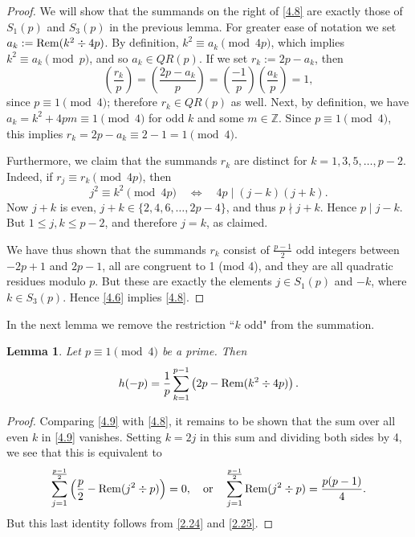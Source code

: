 \documentclass{amsart}
\theoremstyle{plain}
\newtheorem{lemma}[theorem]{Lemma}
\numberwithin{equation}{section}
\begin{document}
\begin{proof}
We will show that the summands on the right of \eqref{4.8} are exactly those of
$S_1(p)$ and $S_3(p)$ in the previous lemma. For greater ease of notation we
set $a_k:={\rm Rem}(k^2\div 4p)$. By definition, $k^2\equiv a_k\pmod{4p}$, which
implies $k^2\equiv a_k\pmod{p}$, and so $a_k\in QR(p)$. If we set $r_k:=2p-a_k$,
then 
\[
\left(\frac{r_k}{p}\right)=\left(\frac{2p-a_k}{p}\right)
=\left(\frac{-1}{p}\right)\left(\frac{a_k}{p}\right) = 1,
\]
since $p\equiv 1\pmod{4}$; therefore $r_k\in QR(p)$ as well. Next, by 
definition, we have $a_k=k^2+4pm\equiv 1\pmod{4}$ for odd $k$ and some 
$m\in{\mathbb Z}$. Since $p\equiv 1\pmod{4}$, this implies 
$r_k=2p-a_k\equiv 2-1=1\pmod{4}$.

Furthermore, we claim that the summands $r_k$ are distinct for 
$k=1, 3, 5,\ldots, p-2$. Indeed, if $r_j\equiv r_k\pmod{4p}$, then
\[
j^2\equiv k^2\pmod{4p}\quad\Leftrightarrow\quad 4p\mid(j-k)(j+k).
\]
Now $j+k$ is even, $j+k\in\{2, 4, 6,\ldots, 2p-4\}$, and thus $p\nmid j+k$.
Hence $p\mid j-k$. But $1\leq j, k\leq p-2$, and therefore $j=k$, as claimed.

We have thus shown that the summands $r_k$ consist of $\frac{p-1}{2}$ odd
integers between $-2p+1$ and $2p-1$, all are congruent to 1 (mod 4), and they
are all quadratic residues modulo $p$. But these are exactly the elements
$j\in S_1(p)$ and $-k$, where $k\in S_3(p)$. Hence \eqref{4.6} implies 
\eqref{4.8}.
\end{proof}

In the next lemma we remove the restriction ``$k$ odd" from the summation.

\begin{lemma}\label{lem:4.6}
Let $p\equiv 1\pmod{4}$ be a prime. Then
\begin{equation}\label{4.9}
h(-p)=\frac{1}{p}\sum_{k=1}^{p-1}\left(2p-{\rm Rem}(k^2\div 4p)\right).
\end{equation}
\end{lemma}

\begin{proof}
Comparing \eqref{4.9} with \eqref{4.8}, it remains to be shown that the sum over
all even $k$ in \eqref{4.9} vanishes. Setting $k=2j$ in this sum and dividing
both sides by 4, we see that this is equivalent to
\[
\sum_{j=1}^{\frac{p-1}{2}}\left(\frac{p}{2}-{\rm Rem}(j^2\div p)\right)=0,
\quad\hbox{or}\quad 
\sum_{j=1}^{\frac{p-1}{2}}{\rm Rem}(j^2\div p)=\frac{p(p-1)}{4}.
\]
But this last identity follows from \eqref{2.24} and \eqref{2.25}.
\end{proof}
\end{document}
